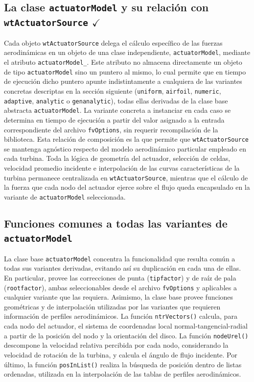 \subsection{La clase \texttt{actuatorModel} y su relación con \texttt{wtActuatorSource} $\checkmark$}
Cada objeto \texttt{wtActuatorSource} delega el cálculo específico de las fuerzas aerodinámicas en un objeto de una clase independiente, \texttt{actuatorModel}, mediante el atributo \texttt{actuatorModel\_}. Este atributo no almacena directamente un objeto de tipo \texttt{actuatorModel} sino un puntero al mismo, lo cual permite que en tiempo de ejecución dicho puntero apunte indistintamente a cualquiera de las variantes concretas descriptas en la sección siguiente (\texttt{uniform}, \texttt{airfoil}, \texttt{numeric}, \texttt{adaptive}, \texttt{analytic} o \texttt{genanalytic}), todas ellas derivadas de la clase base abstracta \texttt{actuatorModel}. La variante concreta a instanciar en cada caso se determina en tiempo de ejecución a partir del valor asignado a la entrada correspondiente del archivo \texttt{fvOptions}, sin requerir recompilación de la biblioteca. Esta relación de composición es la que permite que \texttt{wtActuatorSource} se mantenga agnóstico respecto del modelo aerodinámico particular empleado en cada turbina. Toda la lógica de geometría del actuador, selección de celdas, velocidad promedio incidente e interpolación de las curvas características de la turbina permanece centralizada en \texttt{wtActuatorSource}, mientras que el cálculo de la fuerza que cada nodo del actuador ejerce sobre el flujo queda encapsulado en la variante de \texttt{actuatorModel} seleccionada.

\subsection{Funciones comunes a todas las variantes de \texttt{actuatorModel} \checkmark}
La clase base \texttt{actuatorModel} concentra la funcionalidad que resulta común a todas sus variantes derivadas, evitando así su duplicación en cada una de ellas. En particular, provee las correcciones de punta (\texttt{tipfactor}) y de raíz de pala (\texttt{rootfactor}), ambas seleccionables desde el archivo \texttt{fvOptions} y aplicables a cualquier variante que las requiera. Asimismo, la clase base provee funciones geométricas y de interpolación utilizadas por las variantes que requieren información de perfiles aerodinámicos. La función \texttt{ntrVectors()} calcula, para cada nodo del actuador, el sistema de coordenadas local normal-tangencial-radial a partir de la posición del nodo y la orientación del disco. La función \texttt{nodeUrel()} descompone la velocidad relativa percibida por cada nodo, considerando la velocidad de rotación de la turbina, y calcula el ángulo de flujo incidente. Por último, la función \texttt{posInList()} realiza la búsqueda de posición dentro de listas ordenadas, utilizada en la interpolación de las tablas de perfiles aerodinámicos.

